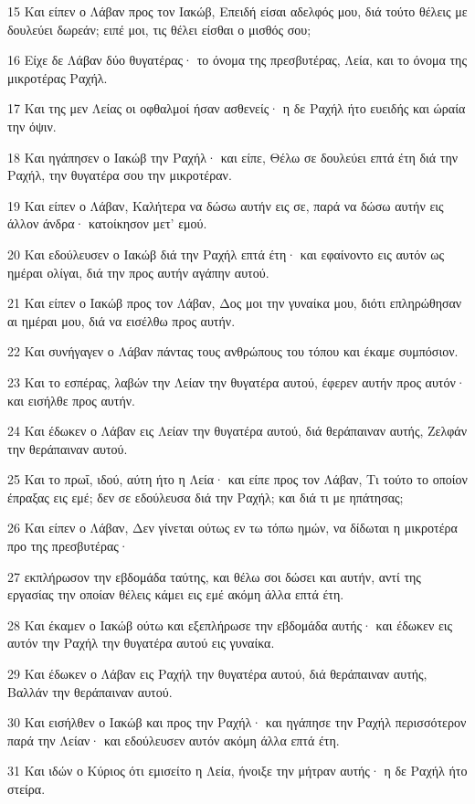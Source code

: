 \par 15 Και είπεν ο Λάβαν προς τον Ιακώβ, Επειδή είσαι αδελφός μου, διά τούτο θέλεις με δουλεύει δωρεάν; ειπέ μοι, τις θέλει είσθαι ο μισθός σου;
\par 16 Είχε δε Λάβαν δύο θυγατέρας· το όνομα της πρεσβυτέρας, Λεία, και το όνομα της μικροτέρας Ραχήλ.
\par 17 Και της μεν Λείας οι οφθαλμοί ήσαν ασθενείς· η δε Ραχήλ ήτο ευειδής και ώραία την όψιν.
\par 18 Και ηγάπησεν ο Ιακώβ την Ραχήλ· και είπε, Θέλω σε δουλεύει επτά έτη διά την Ραχήλ, την θυγατέρα σου την μικροτέραν.
\par 19 Και είπεν ο Λάβαν, Καλήτερα να δώσω αυτήν εις σε, παρά να δώσω αυτήν εις άλλον άνδρα· κατοίκησον μετ' εμού.
\par 20 Και εδούλευσεν ο Ιακώβ διά την Ραχήλ επτά έτη· και εφαίνοντο εις αυτόν ως ημέραι ολίγαι, διά την προς αυτήν αγάπην αυτού.
\par 21 Και είπεν ο Ιακώβ προς τον Λάβαν, Δος μοι την γυναίκα μου, διότι επληρώθησαν αι ημέραι μου, διά να εισέλθω προς αυτήν.
\par 22 Και συνήγαγεν ο Λάβαν πάντας τους ανθρώπους του τόπου και έκαμε συμπόσιον.
\par 23 Και το εσπέρας, λαβών την Λείαν την θυγατέρα αυτού, έφερεν αυτήν προς αυτόν· και εισήλθε προς αυτήν.
\par 24 Και έδωκεν ο Λάβαν εις Λείαν την θυγατέρα αυτού, διά θεράπαιναν αυτής, Ζελφάν την θεράπαιναν αυτού.
\par 25 Και το πρωΐ, ιδού, αύτη ήτο η Λεία· και είπε προς τον Λάβαν, Τι τούτο το οποίον έπραξας εις εμέ; δεν σε εδούλευσα διά την Ραχήλ; και διά τι με ηπάτησας;
\par 26 Και είπεν ο Λάβαν, Δεν γίνεται ούτως εν τω τόπω ημών, να δίδωται η μικροτέρα προ της πρεσβυτέρας·
\par 27 εκπλήρωσον την εβδομάδα ταύτης, και θέλω σοι δώσει και αυτήν, αντί της εργασίας την οποίαν θέλεις κάμει εις εμέ ακόμη άλλα επτά έτη.
\par 28 Και έκαμεν ο Ιακώβ ούτω και εξεπλήρωσε την εβδομάδα αυτής· και έδωκεν εις αυτόν την Ραχήλ την θυγατέρα αυτού εις γυναίκα.
\par 29 Και έδωκεν ο Λάβαν εις Ραχήλ την θυγατέρα αυτού, διά θεράπαιναν αυτής, Βαλλάν την θεράπαιναν αυτού.
\par 30 Και εισήλθεν ο Ιακώβ και προς την Ραχήλ· και ηγάπησε την Ραχήλ περισσότερον παρά την Λείαν· και εδούλευσεν αυτόν ακόμη άλλα επτά έτη.
\par 31 Και ιδών ο Κύριος ότι εμισείτο η Λεία, ήνοιξε την μήτραν αυτής· η δε Ραχήλ ήτο στείρα.

